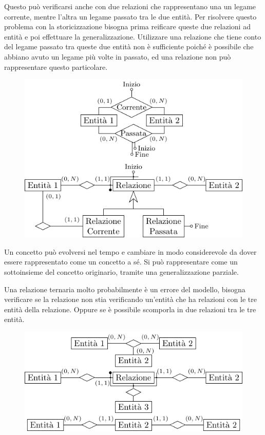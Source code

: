\documentclass{article}
\numberwithin{equation}{subsection}
\begin{document}
Questo può verificarsi anche con due relazioni che rappresentano una un legame corrente, mentre 
l'altra un legame passato tra le due entità. Per risolvere questo problema con la storicizzazione 
bisogna prima reificare queste due relazioni ad entità e poi effettuare la generalizzazione. Utilizzare 
una relazione che tiene conto del legame passato tra queste due entità non è sufficiente poiché 
è possibile che abbiano avuto un legame più volte in passato, ed una relazione non può 
rappresentare questo particolare. 

\begin{figure}[H]%
    \centering%
    \includegraphics[scale=1.25]{storicizzazione_concetto_relazione.pdf}%
\end{figure}

Un concetto può evolversi nel tempo e cambiare in modo considerevole da dover essere rappresentato 
come un concetto a sé. Si può rappresentare come un sottoinsieme del concetto originario, 
tramite una generalizzazione parziale. 

Una relazione ternaria molto probabilmente è un errore del modello, bisogna verificare 
se la relazione non stia verificando un'entità che ha relazioni con le tre entità della 
relazione. Oppure se è possibile scomporla in due relazioni tra le tre entità. 

\begin{figure}[H]%
    \centering
    \includegraphics[scale=1.25]{reificazione_relationship_ternaria.pdf}%
\end{figure}
\end{document}
